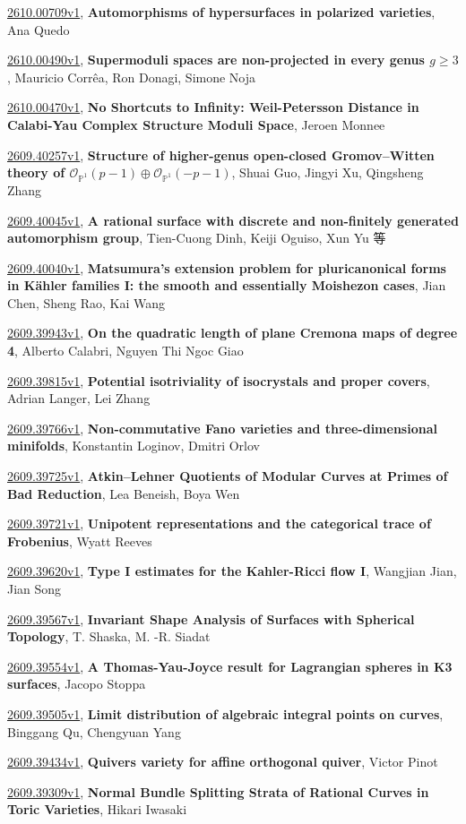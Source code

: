 \documentclass[9pt, a4paper]{article}
\theoremstyle{plain}
\theoremstyle{definition}
\theoremstyle{remark}
\newcommand{\arxiv}[3]{\href{https://arxiv.org/abs/#1}{#1}, \textbf{\textcolor{arxivblue}{#2}}, #3}
\begin{document}
\arxiv{2610.00709v1}{Automorphisms of hypersurfaces in polarized varieties}{Ana Quedo}

\arxiv{2610.00490v1}{Supermoduli spaces are non-projected in every genus $g\geq 3$}{Mauricio Corrêa, Ron Donagi, Simone Noja}

\arxiv{2610.00470v1}{No Shortcuts to Infinity: Weil-Petersson Distance in Calabi-Yau Complex Structure Moduli Space}{Jeroen Monnee}

\arxiv{2609.40257v1}{Structure of higher-genus open-closed Gromov--Witten theory of $\mathcal{O}_{\mathbb{P}^{1}}(p-1)\oplus\mathcal{O}_{\mathbb{P}^{1}}(-p-1)$}{Shuai Guo, Jingyi Xu, Qingsheng Zhang}

\arxiv{2609.40045v1}{A rational surface with discrete and non-finitely generated automorphism group}{Tien-Cuong Dinh, Keiji Oguiso, Xun Yu 等}

\arxiv{2609.40040v1}{Matsumura's extension problem for pluricanonical forms in Kähler families I: the smooth and essentially Moishezon cases}{Jian Chen, Sheng Rao, Kai Wang}

\arxiv{2609.39943v1}{On the quadratic length of plane Cremona maps of degree 4}{Alberto Calabri, Nguyen Thi Ngoc Giao}

\arxiv{2609.39815v1}{Potential isotriviality of isocrystals and proper covers}{Adrian Langer, Lei Zhang}

\arxiv{2609.39766v1}{Non-commutative Fano varieties and three-dimensional minifolds}{Konstantin Loginov, Dmitri Orlov}

\arxiv{2609.39725v1}{Atkin--Lehner Quotients of Modular Curves at Primes of Bad Reduction}{Lea Beneish, Boya Wen}

\arxiv{2609.39721v1}{Unipotent representations and the categorical trace of Frobenius}{Wyatt Reeves}

\arxiv{2609.39620v1}{Type I estimates for the Kahler-Ricci flow I}{Wangjian Jian, Jian Song}

\arxiv{2609.39567v1}{Invariant Shape Analysis of Surfaces with Spherical Topology}{T. Shaska, M. -R. Siadat}

\arxiv{2609.39554v1}{A Thomas-Yau-Joyce result for Lagrangian spheres in K3 surfaces}{Jacopo Stoppa}

\arxiv{2609.39505v1}{Limit distribution of algebraic integral points on curves}{Binggang Qu, Chengyuan Yang}

\arxiv{2609.39434v1}{Quivers variety for affine orthogonal quiver}{Victor Pinot}

\arxiv{2609.39309v1}{Normal Bundle Splitting Strata of Rational Curves in Toric Varieties}{Hikari Iwasaki}
\end{document}
